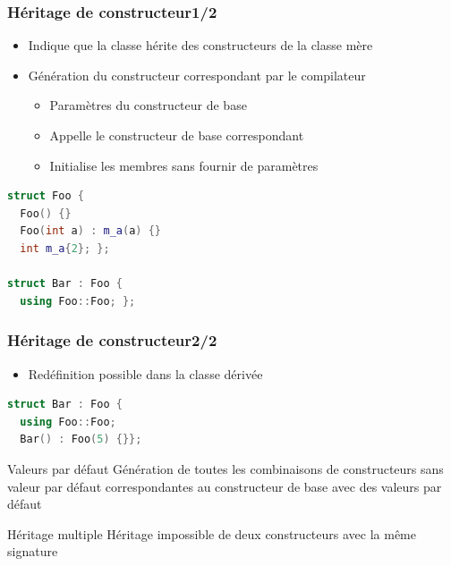 \documentclass[C++.tex]{subfiles}
\begin{document}
\begin{frame}[fragile]
	\frametitle{Héritage de constructeur\titlehfill{}1/2}
	\begin{itemize}
		\item Indique que la classe hérite des constructeurs de la classe mère
		\item Génération du constructeur correspondant par le compilateur
		\begin{itemize}
			\item Paramètres du constructeur de base
			\item Appelle le constructeur de base correspondant
			\item Initialise les membres sans fournir de paramètres

		\end{itemize}
	\end{itemize}

	\begin{lstlisting}[language=C++]
struct Foo {
  Foo() {}
  Foo(int a) : m_a(a) {}
  int m_a{2}; };

struct Bar : Foo {
  using Foo::Foo; };\end{lstlisting}
\end{frame}

\begin{frame}[fragile]
	\frametitle{Héritage de constructeur\titlehfill{}2/2}
	\begin{itemize}
		\item Redéfinition possible dans la classe dérivée
	\end{itemize}

	\begin{lstlisting}[language=C++]
struct Bar : Foo {
  using Foo::Foo;
  Bar() : Foo(5) {}};\end{lstlisting}

	\begin{alertblock}{Valeurs par défaut}
		Génération de toutes les combinaisons de constructeurs sans valeur par défaut correspondantes au constructeur de base avec des valeurs par défaut

	\end{alertblock}

	\begin{alertblock}{Héritage multiple}
		Héritage impossible de deux constructeurs avec la même signature
	\end{alertblock}

\end{frame}
\end{document}

